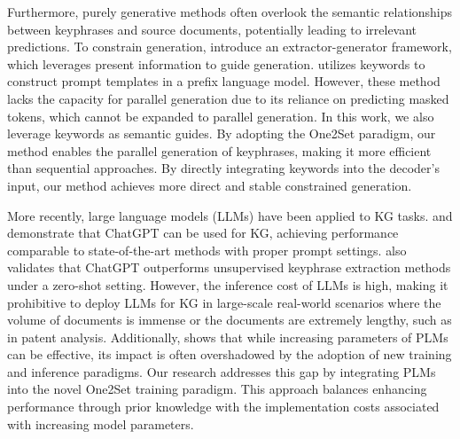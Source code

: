 Furthermore, purely generative methods often overlook the semantic relationships between keyphrases and source documents, potentially leading to irrelevant predictions. To constrain generation, \cite{segnet, unikeyphrase} introduce an extractor-generator framework, which leverages present information to guide generation. \cite{promptkp} utilizes keywords to construct prompt templates in a prefix language model. However, these method lacks the capacity for parallel generation due to its reliance on predicting masked tokens, which cannot be expanded to parallel generation. In this work, we also leverage keywords as semantic guides. By adopting the One2Set paradigm, our method enables the parallel generation of keyphrases, making it more efficient than sequential approaches. By directly integrating keywords into the decoder's input, our method achieves more direct and stable constrained generation.

More recently, large language models (LLMs) have been applied to KG tasks. \cite{GPT_keyphrase} and \cite{GPT_survey} demonstrate that ChatGPT can be used for KG, achieving performance comparable to state-of-the-art methods with proper prompt settings. \cite{keyphrase_survey} also validates that ChatGPT outperforms unsupervised keyphrase extraction methods under a zero-shot setting. However, the inference cost of LLMs is high, making it prohibitive to deploy LLMs for KG in large-scale real-world scenarios where the volume of documents is immense or the documents are extremely lengthy, such as in patent analysis. Additionally, \cite{keyphrase_survey} shows that while increasing  parameters of PLMs can be effective, its impact is often overshadowed by the adoption of new training and inference paradigms. Our research addresses this gap by integrating PLMs into the novel One2Set training paradigm. This approach balances enhancing performance through prior knowledge with the implementation costs associated with increasing model parameters.


